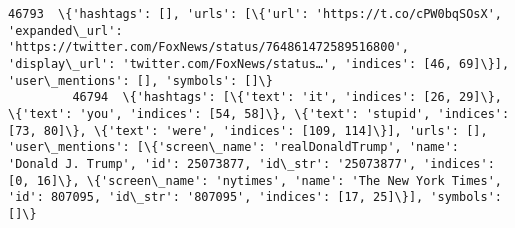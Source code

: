 \documentclass[11pt]{article}
\begin{document}
\begin{Verbatim}[commandchars=\\\{\}]
         46793  \{'hashtags': [], 'urls': [\{'url': 'https://t.co/cPW0bqSOsX', 'expanded\_url': 'https://twitter.com/FoxNews/status/764861472589516800', 'display\_url': 'twitter.com/FoxNews/status…', 'indices': [46, 69]\}], 'user\_mentions': [], 'symbols': []\}                                                                                                                                                                                                                                                                                                                                                                                                                                                                                                                                                                                                                                                                                                                                                                                                                                                                                                                                                                 
         46794  \{'hashtags': [\{'text': 'it', 'indices': [26, 29]\}, \{'text': 'you', 'indices': [54, 58]\}, \{'text': 'stupid', 'indices': [73, 80]\}, \{'text': 'were', 'indices': [109, 114]\}], 'urls': [], 'user\_mentions': [\{'screen\_name': 'realDonaldTrump', 'name': 'Donald J. Trump', 'id': 25073877, 'id\_str': '25073877', 'indices': [0, 16]\}, \{'screen\_name': 'nytimes', 'name': 'The New York Times', 'id': 807095, 'id\_str': '807095', 'indices': [17, 25]\}], 'symbols': []\}                                                                                                                                                                                                                                                                                                                                                                                                                                                                                                                                                                                                                                                                                                                                            

\end{Verbatim}
\end{document}
